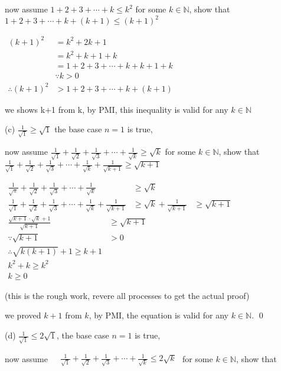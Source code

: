 \documentclass{article}
\begin{document}
now assume $1+2+3+\cdots+k\leq k^2$ for some $k\in \mathbb{N}$, show that $1+2+3+\cdots+k+(k+1)\leq (k+1)^2$

\begin{center}
    $\begin{aligned}\left(k+1\right)^2&=k^2+2k+1\\&=k^2+k+1+k\\&=1+2+3+\cdots+k+k+1+k\\&\because k>0\\\therefore(k+1)^2&>1+2+3+\cdots+k+(k+1)\end{aligned}$
\end{center}

we shows k+1 from k, by PMI, this inequality is valid for any $k\in \mathbb{N}$

(c) $\frac{1}{\sqrt{1}}\geq \sqrt{1}$ the base case $n=1$ is true,

now assume $\frac1{\sqrt{1}}+\frac1{\sqrt{2}}+\frac1{\sqrt{3}}+\cdots+\frac1{\sqrt{k}}\geq\sqrt{k}$ for some $k\in \mathbb{N}$, show that $\frac1{\sqrt{1}}+\frac1{\sqrt{2}}+\frac1{\sqrt{3}}+\cdots+\frac1{\sqrt{k}}+\frac{1}{\sqrt{k+1}}\geq\sqrt{k+1}$

\begin{center}
    $\begin{aligned}\frac1{\sqrt{\pi}}+\frac1{\sqrt{2}}+\frac1{\sqrt{3}}+\cdots+\frac1{\sqrt{k}}&\geq\sqrt{k}\\\frac1{\sqrt{1}}+\frac1{\sqrt{2}}+\frac1{\sqrt{3}}+\cdots+\frac1{\sqrt{k}}+\frac1{\sqrt{k+1}}&\geq\sqrt{k}+\frac1{\sqrt{k+1}}&\geq\sqrt{k+1}\end{aligned}$\\
    $\begin{aligned}\frac{\sqrt{k+1}\cdot\sqrt{k}+1}{\sqrt{k+1}}&\geq\sqrt{k+1}\\\because\sqrt{k+1}&>0\\\therefore\sqrt{k(k+1)}+1\geq k+1\\k^{2}+k\geq k^{2}\\k\geq0\end{aligned}$
\end{center}

(this is the rough work, revere all processes to get the actual proof)

we proved $k+1$ from $k$, by PMI, the equation is valid for any $k\in \mathbb{N}$. \qed

(d) $\frac{1}{\sqrt{1}}\leq 2\sqrt{1}$, the base case $n=1$ is true,

now assume $\begin{aligned}&\frac{1}{\sqrt{1}}+\frac{1}{\sqrt{2}}+\frac{1}{\sqrt{3}}+\cdots+\frac{1}{\sqrt{k}}\leq2\sqrt{k}\end{aligned}$ for some $k\in \mathbb{N}$, show that 
\end{document}
